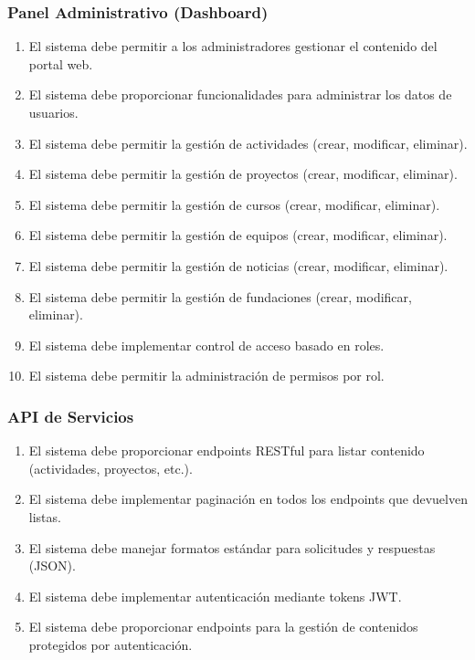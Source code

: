\documentclass[11pt,a4paper]{article}
\newcommand{\reqnum}[1]{\textbf{\underline{RF-#1}}}
\begin{document}
\subsubsection{Panel Administrativo (Dashboard)}
\begin{enumerate}[leftmargin=*,labelwidth=2.5cm,align=left,start=11]
	\item[\reqnum{011}] El sistema debe permitir a los administradores gestionar el contenido del portal web.
	\item[\reqnum{012}] El sistema debe proporcionar funcionalidades para administrar los datos de usuarios.
	\item[\reqnum{013}] El sistema debe permitir la gestión de actividades (crear, modificar, eliminar).
	\item[\reqnum{014}] El sistema debe permitir la gestión de proyectos (crear, modificar, eliminar).
	\item[\reqnum{015}] El sistema debe permitir la gestión de cursos (crear, modificar, eliminar).
	\item[\reqnum{016}] El sistema debe permitir la gestión de equipos (crear, modificar, eliminar).
	\item[\reqnum{017}] El sistema debe permitir la gestión de noticias (crear, modificar, eliminar).
	\item[\reqnum{018}] El sistema debe permitir la gestión de fundaciones (crear, modificar, eliminar).
	\item[\reqnum{019}] El sistema debe implementar control de acceso basado en roles.
	\item[\reqnum{020}] El sistema debe permitir la administración de permisos por rol.
\end{enumerate}

\subsubsection{API de Servicios}
\begin{enumerate}[leftmargin=*,labelwidth=2.5cm,align=left,start=21]
	\item[\reqnum{021}] El sistema debe proporcionar endpoints RESTful para listar contenido (actividades, proyectos, etc.).
	\item[\reqnum{022}] El sistema debe implementar paginación en todos los endpoints que devuelven listas.
	\item[\reqnum{023}] El sistema debe manejar formatos estándar para solicitudes y respuestas (JSON).
	\item[\reqnum{024}] El sistema debe implementar autenticación mediante tokens JWT.
	\item[\reqnum{025}] El sistema debe proporcionar endpoints para la gestión de contenidos protegidos por autenticación.
\end{enumerate}
\end{document}
